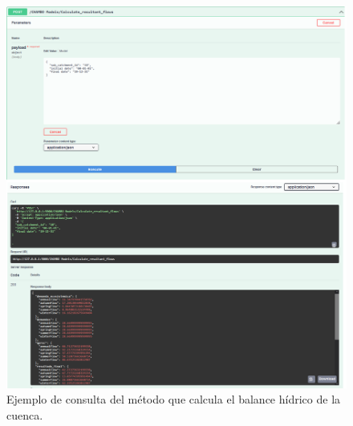   \begin{figure}[h!]
    \begin{center}
      \includegraphics[height=7.in]{Figures/consulta_MELCA.png}
      \caption{ Ejemplo de consulta del método que calcula el balance hídrico de la cuenca. }
      \label{MELCA}
    \end{center}
  \end{figure}







